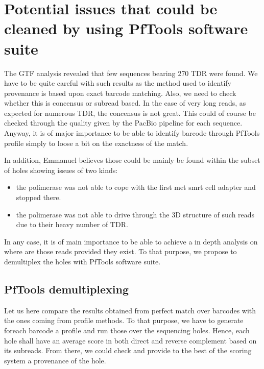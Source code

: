\documentclass{article}\usepackage[]{graphicx}\usepackage[]{color}
\begin{document}
\section{Potential issues that could be cleaned by using PfTools software suite}
The GTF analysis revealed that few sequences bearing 270 TDR were found. We have to be quite careful with such results as the method used to identify provenance is based upon exact barcode matching. Also, we need to check whether this is concensus or subread based. In the case of very long reads, as expected for numerous TDR, the concensus is not great. This could of course be checked through the quality given by the PacBio pipeline for each sequence. Anyway, it is of major importance to be able to identify barcode through PfTools profile simply to loose a bit on the exactness of the match.

In addition, Emmanuel believes those could be mainly be found within the subset of holes showing issues of two kinds:
\begin{itemize}
  \item the polimerase was not able to cope with the first met smrt cell adapter and stopped there.
  \item the polimerase was not able to drive through the 3D structure of such reads due to their heavy number of TDR.
\end{itemize}
In any case, it is of main importance to be able to achieve a in depth analysis on where are those reads provided they exist. To that purpose, we propose to demultiplex the holes with PfTools software suite.

\subsection{PfTools demultiplexing}
Let us here compare the results obtained from perfect match over barcodes with the ones coming from profile methods. To that purpose, we have to generate foreach barcode a profile and run those over the sequencing holes. Hence, each hole shall have an average score in both direct and reverse complement based on its subreads. From there, we could check and provide to the best of the scoring system a provenance of the hole.



\section{}
\end{document}
